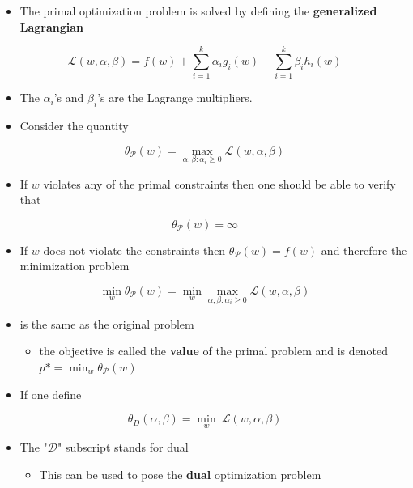 \documentclass[11pt]{article}
\begin{document}
\begin{itemize}
\item The primal optimization problem is solved by defining the \textbf{generalized Lagrangian}
\end{itemize}
\begin{equation}
  \mathcal L (w,\alpha,\beta) = f(w) + \sum_{i=1}^k \alpha_ig_i(w) + \sum_{i=1}^k \beta_ih_i(w)
\end{equation}
\begin{itemize}
\item The \(\alpha_i\)'s and \(\beta_i\)'s are the Lagrange multipliers.
\item Consider the quantity
\end{itemize}
\begin{equation}
    \theta_\mathcal{P}(w) = \max_{\alpha, \beta: \alpha_i \geq 0} \mathcal L (w,\alpha,\beta)
\end{equation}
\begin{itemize}
\item If \(w\) violates any of the primal constraints then one should be able to verify that
\end{itemize}
\begin{equation}
    \theta_\mathcal P (w) = \infty
\end{equation}
\begin{itemize}
\item If \(w\) does not violate the constraints then \(\theta_\mathcal P(w) = f(w)\) and therefore the minimization problem
\end{itemize}
\begin{equation}
  \min_w\theta_\mathcal P(w) = \min_w \max_{\alpha,\beta:\alpha_i \geq 0} \mathcal L (w,\alpha,\beta)
\end{equation}
\begin{itemize}
\item is the same as the original problem
\begin{itemize}
\item the objective is called the \textbf{value} of the primal problem and is denoted \(p* = \min_w \theta _ \mathcal P (w)\)
\end{itemize}

\item If one define
\end{itemize}
\begin{equation}
    \theta_D(\alpha,\beta) = \min_w \ \mathcal L (w,\alpha,\beta)
\end{equation}
\begin{itemize}
\item The "\(\mathcal D\)" subscript stands for dual
\begin{itemize}
\item This can be used to pose the \textbf{dual} optimization problem
\end{itemize}
\end{itemize}
\end{document}
